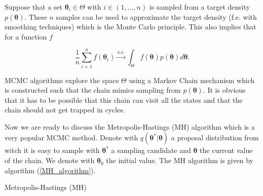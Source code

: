 \documentclass[12pt,a4paper,oneside]{book}
\makeatletter
\def\BState{\State\hskip-\ALG@thistlm}
\makeatother
\begin{document}
Suppose that a set $\bm{\theta}_i \in \Theta$ with $i \in (1, \ldots, n)$ is sampled  from a target density $p(\bm{\theta})$. These $n$ samples can be used to approximate the target density (f.e. with smoothing techniques) which is the Monte Carlo principle. This also implies that for a function $f$

\begin{equation}
\dfrac{1}{n} \sum\limits_{i=1}^{n} f(\bm{\theta}_i) \xrightarrow{\text{a.s.}} \int_{\Theta} f(\bm{\theta})p(\bm{\theta}) d\bm{\theta}.
\end{equation}

MCMC algorithms explore the space $\Theta$ using a Markov Chain mechanism which is constructed such that the chain mimics sampling from $p(\bm{\theta})$. It is obvious that it has to be possible that this chain can visit all the states and that the chain should not get trapped in cycles. 

Now we are ready to discuss the Metropolis-Hastings (MH) algorithm which is a very popular MCMC method. Denote with $q(\bm{\theta}^{\ast} | \bm{\theta})$ a proposal distribution from witch it is easy to sample with $\bm{\theta}^{\ast}$ a sampling candidate and $\bm{\theta}$ the current value of the chain. We denote with $\bm{\theta}_0$ the initial value. The MH algorithm is given by algorithm (\ref{MH_algorithm}).

\begin{algorithm}
\caption{Metropolis-Hastings (MH)}\label{MH_algorithm}
\end{algorithm}
\end{document}
